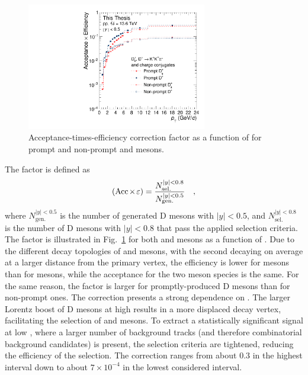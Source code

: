 \begin{figure}[htb]
    \begin{center}
    \includegraphics[width=0.7\textwidth]{Figures/Chapter 6/Efficiency_LHC24d3a.pdf}
    \caption{Acceptance-times-efficiency correction factor as a function of \pt for prompt and non-prompt \ds and \dpl mesons.} 
    \label{fig:Aeff} 
    \end{center}
\end{figure}

The \aeff factor is defined as
\begin{equation*}
    (\mathrm{Acc}\mkern-2mu\times\mkern-2mu\varepsilon) = \frac{N_\mathrm{sel.}^{\lvert y\rvert<0.8}}{N_\mathrm{gen.}^{\lvert y\rvert<0.5}}\quad ,
\end{equation*}
where $N_\mathrm{gen.}^{\lvert y\rvert<0.5}$ is the number of generated D mesons with $\lvert y\rvert<0.5$, and $N_\mathrm{sel.}^{\lvert y\rvert<0.8}$ is the number of D mesons with $\lvert y\rvert<0.8$ that pass the applied selection criteria. The \aeff factor is illustrated in Fig.~\ref{fig:Aeff} for both \ds and \dpl mesons as a function of \pt. Due to the different decay topologies of \ds and \dpl mesons, with the second decaying on average at a larger distance from the primary vertex, the efficiency is lower for \ds mesons than for \dpl mesons, while the acceptance for the two meson species is the same. For the same reason, the \aeff factor is larger for promptly-produced D mesons than for non-prompt ones. The correction presents a strong dependence on \pt. The larger Lorentz boost of D mesons at high \pt results in a more displaced decay vertex, facilitating the selection of \ds and \dpl mesons. To extract a statistically significant signal at low \pt, where a larger number of background tracks (and therefore combinatorial background candidates) is present, the selection criteria are tightened, reducing the efficiency of the selection. The \aeff correction ranges from about 0.3 in the highest \pt interval down to about $7\times 10^{-4}$ in the lowest considered \pt interval.


